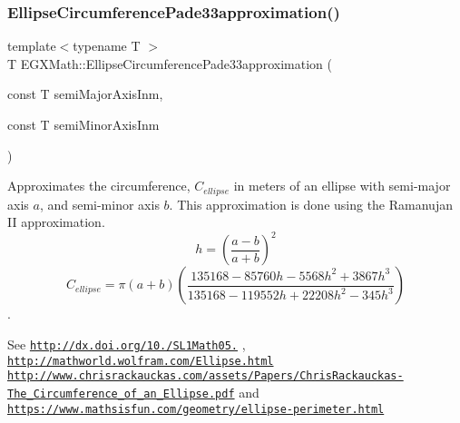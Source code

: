 \subsubsection{\texorpdfstring{Ellipse\+Circumference\+Pade33approximation()}{EllipseCircumferencePade33approximation()}}
{\footnotesize\ttfamily template$<$typename T $>$ \\
T E\+G\+X\+Math\+::\+Ellipse\+Circumference\+Pade33approximation (\begin{DoxyParamCaption}\item[{const T}]{semi\+Major\+Axis\+Inm,  }\item[{const T}]{semi\+Minor\+Axis\+Inm }\end{DoxyParamCaption})}



Approximates the circumference, $C_{ellipse}$ in meters of an ellipse with semi-\/major axis $a$, and semi-\/minor axis $b$. This approximation is done using the Ramanujan II approximation. \[ h=\left( \frac{a-b}{a+b} \right)^2 \] \[ C_{ellipse}=\pi (a + b) \left( \frac{135168-85760 h-5568 h^2+ 3867 h^3}{135168-119552 h+ 22208 h^2 - 345h^3} \right) \]. 

See \href{http://dx.doi.org/10.3247/SL1Math05.004}{\tt http\+://dx.\+doi.\+org/10./\+S\+L1\+Math05.} , \href{http://mathworld.wolfram.com/Ellipse.html}{\tt http\+://mathworld.\+wolfram.\+com/\+Ellipse.\+html} \href{http://www.chrisrackauckas.com/assets/Papers/ChrisRackauckas-The_Circumference_of_an_Ellipse.pdf}{\tt http\+://www.\+chrisrackauckas.\+com/assets/\+Papers/\+Chris\+Rackauckas-\/\+The\+\_\+\+Circumference\+\_\+of\+\_\+an\+\_\+\+Ellipse.\+pdf} and \href{https://www.mathsisfun.com/geometry/ellipse-perimeter.html}{\tt https\+://www.\+mathsisfun.\+com/geometry/ellipse-\/perimeter.\+html}

